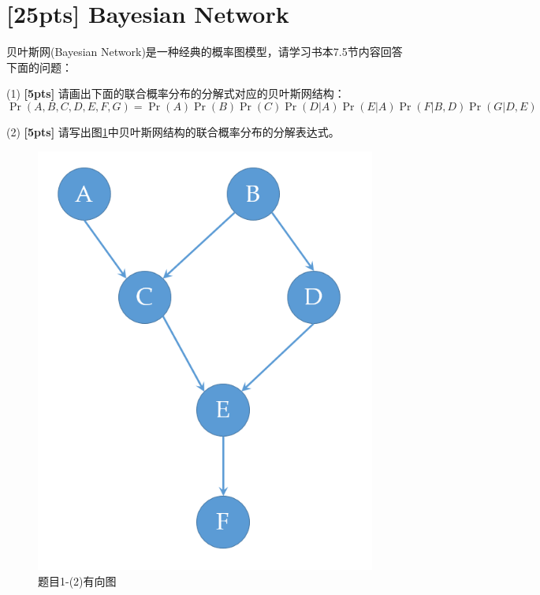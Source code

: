 \documentclass[a4paper,UTF8]{article}
\theoremstyle{definition}
\begin{document}
	\newpage




\section{\textbf{[25pts]} Bayesian Network}
贝叶斯网(Bayesian Network)是一种经典的概率图模型，请学习书本7.5节内容回答下面的问题：

(1) \textbf{[5pts]} 请画出下面的联合概率分布的分解式对应的贝叶斯网结构：
\begin{equation*}
\Pr(A, B, C, D, E, F, G) = \Pr(A)\Pr(B)\Pr(C)\Pr(D|A)\Pr(E|A)\Pr(F|B, D)\Pr(G|D, E)
\end{equation*}

(2) \textbf{[5pts]} 请写出图\ref{fig-DAG}中贝叶斯网结构的联合概率分布的分解表达式。
\begin{figure}[h]
\centering
\includegraphics[scale=0.3]{bayes_net.png}
\caption{题目1-(2)有向图}
\label{fig-DAG}
\end{figure}
\end{document}
